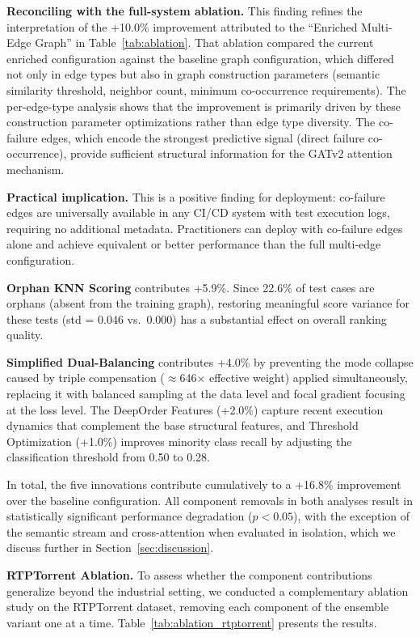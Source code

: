 \textbf{Reconciling with the full-system ablation.} This finding refines
the interpretation of the +10.0\% improvement attributed to the
``Enriched Multi-Edge Graph'' in Table~\ref{tab:ablation}. That ablation
compared the current enriched configuration against the
baseline graph configuration, which differed not only in edge types
but also in graph construction parameters (semantic similarity threshold,
neighbor count, minimum co-occurrence requirements). The per-edge-type
analysis shows that the improvement is primarily driven by these
construction parameter optimizations rather than edge type diversity. The
co-failure edges, which encode the strongest predictive signal (direct
failure co-occurrence), provide sufficient structural information for the
GATv2 attention mechanism.

\textbf{Practical implication.} This is a positive finding for
deployment: co-failure edges are universally available in any CI/CD system
with test execution logs, requiring no additional metadata. Practitioners
can deploy \filopriori{} with co-failure edges alone and achieve
equivalent or better performance than the full multi-edge configuration.

\textbf{Orphan KNN Scoring} contributes +5.9\%. Since 22.6\% of test cases
are orphans (absent from the training graph), restoring meaningful score
variance for these tests (std = 0.046 vs.\ 0.000) has a substantial effect
on overall ranking quality.

\textbf{Simplified Dual-Balancing} contributes +4.0\% by preventing the mode
collapse caused by triple compensation ($\approx$646$\times$ effective weight)
applied simultaneously, replacing it with balanced sampling at the data level
and focal gradient focusing at the loss level. The DeepOrder Features (+2.0\%) capture
recent execution dynamics that complement the base structural features, and
Threshold Optimization (+1.0\%) improves minority class recall by
adjusting the classification threshold from 0.50 to 0.28.

In total, the five innovations contribute cumulatively to a +16.8\% improvement
over the baseline configuration. All component removals in both analyses
result in statistically significant performance degradation ($p < 0.05$),
with the exception of the semantic stream and cross-attention when evaluated
in isolation, which we discuss further in Section~\ref{sec:discussion}.

\textbf{RTPTorrent Ablation.}
To assess whether the component contributions generalize beyond the industrial
setting, we conducted a complementary ablation study on the RTPTorrent dataset,
removing each component of the ensemble variant one at a time.
Table~\ref{tab:ablation_rtptorrent} presents the results.

